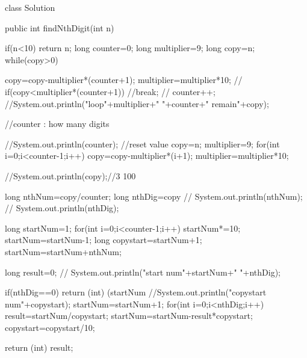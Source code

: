 class Solution {
    public int findNthDigit(int n) {
        if(n<10){
            return n;
        }
        long counter=0;
        long multiplier=9;
        long copy=n;
        while(copy>0){
            copy=copy-multiplier*(counter+1);
            multiplier=multiplier*10;
             // if(copy<multiplier*(counter+1)){
                  //break;
              //}
            counter++;
             //System.out.println("loop"+multiplier+" "+counter+" remain"+copy);
          
        }//counter : how many digits
        
        //System.out.println(counter);
        //reset value
        copy=n;
        multiplier=9;
        for(int i=0;i<counter-1;i++){
            copy=copy-multiplier*(i+1);
            multiplier=multiplier*10;
        }
        
        //System.out.println(copy);//3  100
        
        long nthNum=copy/counter;
        long nthDig=copy%
       // System.out.println(nthNum);
       // System.out.println(nthDig);
        
        long startNum=1;
        for(int i=0;i<counter-1;i++){
            startNum*=10;
        }
        startNum=startNum-1;
        long copystart=startNum+1;
        startNum=startNum+nthNum;
        
        
        long result=0;
       // System.out.println("start num"+startNum+"  "+nthDig);
        
        if(nthDig==0){
            return (int) (startNum%
        }
       //System.out.println("copystart num"+copystart);
        startNum=startNum+1;
        for(int i=0;i<nthDig;i++){
            result=startNum/copystart;
            startNum=startNum-result*copystart;
            copystart=copystart/10;
        }
        
        return (int) result;
        
    }
}
